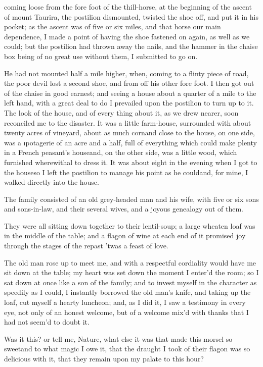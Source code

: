 \documentclass[twoside]{article}
\begin{document}
\vskip 6pt


 coming loose from the
fore foot of the thill-horse, at the
beginning of the ascent of mount Taurira,
the postilion dismounted, twisted the shoe
off, and put it in his pocket; as the
ascent was of five or six miles, and that
horse our main dependence, I made a point
of having the shoe fastened on again, as
well as we could; but the postilion had
thrown away the nails, and the hammer in
the chaise box being of no great use
without them, I submitted to go on.

He had not mounted half a mile higher,
when, coming to a flinty piece of road,
the poor devil lost a second shoe, and
from off his other fore foot.  I then got
out of the chaise in good earnest; and
seeing a house about a quarter of a mile
to the left hand, with a great deal to do
I prevailed upon the postilion to turn up
to it.  The look of the house, and of
every thing about it, as we drew nearer,
soon reconciled me to the disaster.\tskk
It was a little farm-house, surrounded
with about twenty acres of vineyard, about
as much corn\tskk and close to the house,
on one side, was a \i{potagerie} of an
acre and a half, full of everything which
could make plenty in a French peasant’s
house\tskk and, on the other side, was a
little wood, which furnished wherewithal
to dress it.  It was about eight in the
evening when I got to the house\tskk so I
left the postilion to manage his point as
he could\tskk and, for mine, I walked
directly into the house.

The family consisted of an old grey-headed
man and his wife, with five or six sons
and sons-in-law, and their several wives,
and a joyous genealogy out of them.

They were all sitting down together to
their lentil-soup; a large wheaten loaf
was in the middle of the table; and a
flagon of wine at each end of it promised
joy through the stages of the repast\tskk
’twas a feast of love.

The old man rose up to meet me, and with a
respectful cordiality would have me sit
down at the table; my heart was set down
the moment I enter’d the room; so I sat
down at once like a son of the family; and
to invest myself in the character as
speedily as I could, I instantly borrowed
the old man’s knife, and taking up the
loaf, cut myself a hearty luncheon; and,
as I did it, I saw a testimony in every
eye, not only of an honest welcome, but of
a welcome mix’d with thanks that I had not
seem’d to doubt it.

Was it this? or tell me, Nature, what else
it was that made this morsel so
sweet\tskk and to what magic I owe it,
that the draught I took of their flagon
was so delicious with it, that they remain
upon my palate to this hour?
\end{document}
